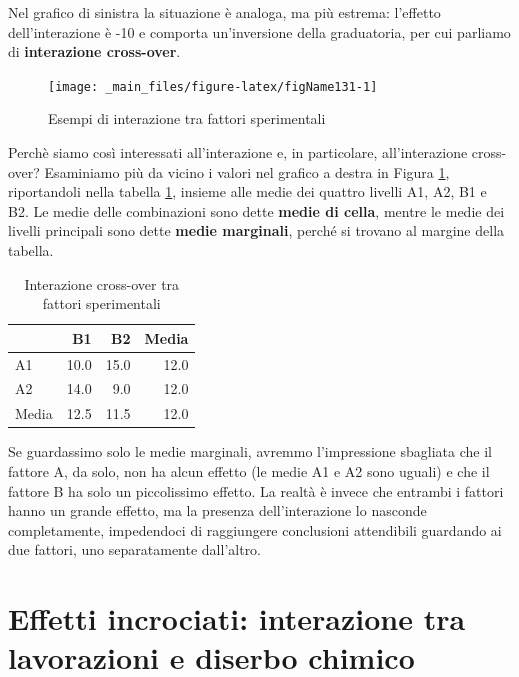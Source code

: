 \documentclass[a4paper,12pt,oneside]{book}
\begin{document}
Nel grafico di sinistra la situazione è analoga, ma più estrema: l'effetto dell'interazione è -10 e comporta un'inversione della graduatoria, per cui parliamo di \textbf{interazione cross-over}.

\begin{figure}

{\centering \texttt{[image: \_main\_files/figure-latex/figName131-1]} 

}

\caption{Esempi di interazione tra fattori sperimentali}\label{fig:figName131}
\end{figure}

Perchè siamo così interessati all'interazione e, in particolare, all'interazione cross-over? Esaminiamo più da vicino i valori nel grafico a destra in Figura \ref{fig:figName131}, riportandoli nella tabella \ref{tab:tabName131}, insieme alle medie dei quattro livelli A1, A2, B1 e B2. Le medie delle combinazioni sono dette \textbf{medie di cella}, mentre le medie dei livelli principali sono dette \textbf{medie marginali}, perché si trovano al margine della tabella.

\begin{table}

\caption{\label{tab:tabName131}Interazione cross-over tra fattori sperimentali}
\centering
\begin{tabular}[t]{lrrr}
\toprule
  & B1 & B2 & Media\\
\midrule
A1 & 10.0 & 15.0 & 12.0\\
A2 & 14.0 & 9.0 & 12.0\\
Media & 12.5 & 11.5 & 12.0\\
\bottomrule
\end{tabular}
\end{table}

Se guardassimo solo le medie marginali, avremmo l'impressione sbagliata che il fattore A, da solo, non ha alcun effetto (le medie A1 e A2 sono uguali) e che il fattore B ha solo un piccolissimo effetto. La realtà è invece che entrambi i fattori hanno un grande effetto, ma la presenza dell'interazione lo nasconde completamente, impedendoci di raggiungere conclusioni attendibili guardando ai due fattori, uno separatamente dall'altro.

\hypertarget{effetti-incrociati-interazione-tra-lavorazioni-e-diserbo-chimico}{%
\section{Effetti incrociati: interazione tra lavorazioni e diserbo chimico}\label{effetti-incrociati-interazione-tra-lavorazioni-e-diserbo-chimico}}
\end{document}

